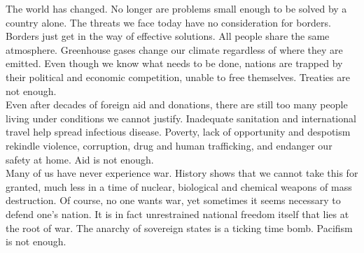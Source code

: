 \documentclass[11pt,a4paper]{article}
\begin{document}
The world has changed. No longer are problems small enough to be solved by a country alone.
The threats we face today have no consideration for borders. Borders just get in the way of effective solutions.
\noindent All people share the same atmosphere.
Greenhouse gases change our climate regardless of where they are emitted.
Even though we know what needs to be done, nations are trapped by their political and economic competition, unable to free themselves. \hfill Treaties are not enough.\\
\noindent Even after decades of foreign aid and donations, there are still too many people living under conditions we cannot justify.
Inadequate sanitation and international travel help spread infectious disease.
Poverty, lack of opportunity and despotism rekindle violence, corruption, drug and human trafficking, and endanger our safety at home.
\hfill Aid is not enough.\\
\noindent Many of us have never experience war.
History shows that we cannot take this for granted, much less in a time of nuclear, biological and chemical weapons of mass destruction.
Of course, no one wants war, yet sometimes it seems necessary to defend one's nation.
It is in fact unrestrained national freedom itself that lies at the root of war.
The anarchy of sovereign states is a ticking time bomb. \hfill Pacifism is not enough.
\end{document}
